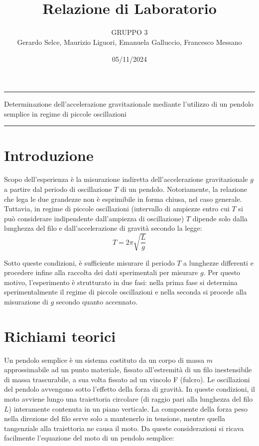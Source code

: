 \documentclass[11pt]{article}
\begin{document}
\setlength{\parindent}{0pt}
\title{\vspace{-4em}{\large Laboratorio di Meccanica e Termodinamica} \\
    Relazione di Laboratorio}
\author{GRUPPO 3 \\
    Gerardo Selce, Maurizio Liguori, Emanuela Galluccio, Francesco Messano}
\date{05/11/2024}
\maketitle

\vspace{-2em}\par\noindent\rule{\textwidth}{0.4pt}
\begin{center}
    {\Large\sc Determinazione dell'accelerazione gravitazionale mediante l'utilizzo di un pendolo semplice in regime di piccole oscillazioni}  
\end{center}
\par\noindent\rule{\textwidth}{0.4pt}
\section{Introduzione}

Scopo dell'esperienza è la misurazione indiretta dell'accelerazione gravitazionale $g$ a partire dal periodo di oscillazione $T$ di un pendolo. Notoriamente, la relazione che lega le due grandezze non è esprimibile in forma chiusa, nel caso generale. Tuttavia, in regime di piccole oscillazioni (intervallo di ampiezze entro cui $T$ si può considerare indipendente dall'ampiezza di oscillazione) $T$ dipende solo dalla lunghezza del filo e dall’accelerazione di gravità secondo la legge:
\begin{equation}
    T=2\pi\sqrt{\frac{L}{g}}
\end{equation}

Sotto queste condizioni, è sufficiente misurare il periodo $T$ a lunghezze differenti e procedere infine alla raccolta dei dati sperimentali per misurare $g$. Per questo motivo, l'esperimento è strutturato in due fasi: nella prima fase  si determina sperimentalmente il regime di piccole oscillazioni e nella seconda si procede alla misurazione di $g$ secondo quanto accennato.

\section{Richiami teorici}

Un pendolo semplice è un sistema costituto da un corpo di massa $m$ approssimabile ad un punto materiale, fissato all’estremità di un filo inestensibile di massa trascurabile, a sua volta fissato ad un vincolo F (fulcro).  Le oscillazioni del pendolo avvengono sotto l'effetto della forza di gravità.
In queste condizioni, il moto avviene lungo una traiettoria circolare (di raggio pari alla lunghezza del filo $L$) interamente contenuta in un piano verticale. La componente della forza peso nella direzione del filo serve solo a mantenerlo in tensione, mentre quella tangenziale alla traiettoria ne causa il moto. Da queste considerazioni si ricava facilmente l'equazione del moto di un pendolo semplice:
\end{document}
